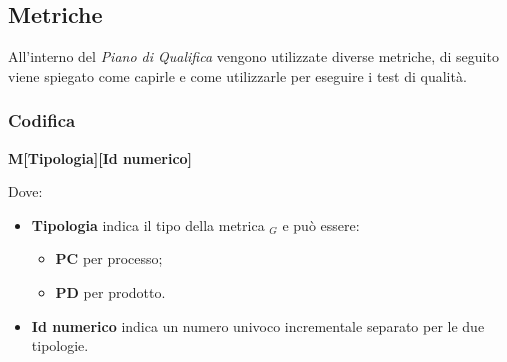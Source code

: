   \subsection{Metriche}\label{sec:Metriche}
  All'interno del \textit{Piano di Qualifica} vengono utilizzate diverse metriche, di seguito viene spiegato come capirle e come utilizzarle per
  eseguire i test di qualità.
  \subsubsection{Codifica}
  \begin{center}
      \textbf{M[Tipologia][Id numerico]}
  \end{center}
  Dove:
    \begin{itemize}
        \item \textbf{Tipologia} indica il tipo della metrica $_G$ e può essere:
                \begin{itemize}
                    \item \textbf{PC} per processo;
                    \item \textbf{PD} per prodotto.
                \end{itemize}
        \item \textbf{Id numerico} indica un numero univoco incrementale separato per le due tipologie.
    \end{itemize}
